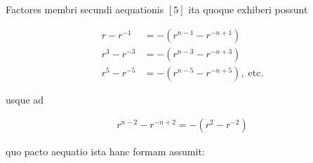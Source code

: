 
Factores membri secundi aequationis $[5]$ ita quoque exhiberi possunt

\[
\begin{aligned}
r-r^{-1}&=-(r^{n-1}-r^{-n+1})\\
r^3-r^{-3}&=-(r^{n-3}-r^{-n+3})\\
r^5-r^{-5}&=-(r^{n-5}-r^{-n+5}),\;\text{etc.}
\end{aligned}
\]

usque ad

\[
\begin{aligned}
r^{n-2}-r^{-n+2}=-(r^2-r^{-2})
\end{aligned}
\]

quo pacto aequatio ista hanc formam assumit:

